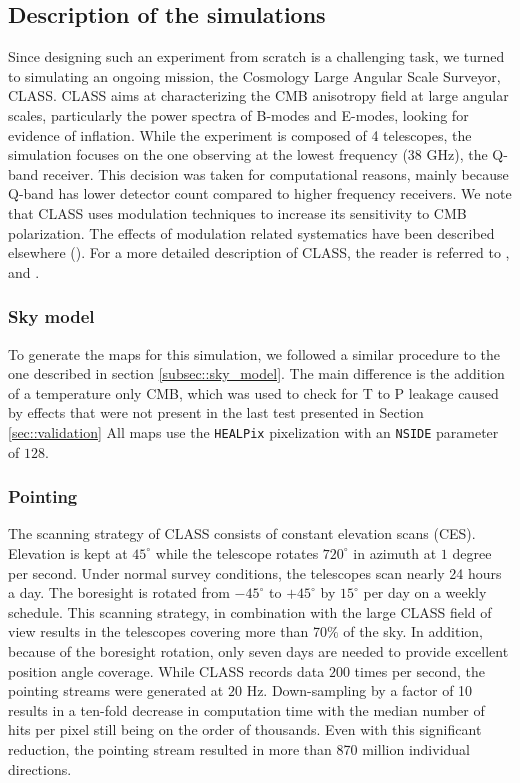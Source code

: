 \documentclass[a4paper,11pt]{article}
\begin{document}
\subsection{Description of the simulations}

Since designing such an experiment from scratch is a challenging task, we turned to simulating an ongoing mission, the Cosmology Large Angular Scale Surveyor, CLASS. CLASS aims at characterizing the CMB anisotropy field at large angular scales, particularly the power spectra of B-modes and E-modes, looking for evidence of inflation. While the experiment is composed of 4 telescopes, the simulation focuses on the one observing at the lowest frequency (38 GHz), the Q-band receiver. This decision was taken for computational reasons, mainly because Q-band has lower detector count compared to higher frequency receivers. We note that CLASS uses modulation techniques to increase its sensitivity to CMB polarization. The effects of modulation related systematics have been described elsewhere (\cite{2016ApJ...818..151M}). For a more detailed description of CLASS, the reader is referred to \cite{2016SPIE.9914E..1KH}, \cite{2014SPIE.9153E..1IE} and \cite{2019ApJ...876..126A}.

\subsubsection{Sky model}

To generate the maps for this simulation, we followed a similar procedure to the one described in section \ref{subsec::sky_model}. The main difference is the addition of a temperature only CMB, which was used to check for T to P leakage caused by effects that were not present in the last test presented in Section \ref{sec::validation} All maps use the \texttt{HEALPix} pixelization with an \texttt{NSIDE} parameter of $128$. 

\subsubsection{Pointing}

The scanning strategy of CLASS consists of constant elevation scans (CES). Elevation is kept at $45^{\circ}$ while the telescope rotates $720^\circ$ in azimuth at $1$ degree per second. Under normal survey conditions, the telescopes scan nearly 24 hours a day. The boresight is rotated from $-45^{\circ}$ to $+45^{\circ}$ by $15^{\circ}$ per day on a weekly schedule. This scanning strategy, in combination with the large CLASS field of view results in the telescopes covering more than 70$\%$ of the sky. In addition, because of the boresight rotation, only seven days are needed to provide excellent position angle coverage. While CLASS records data $200$ times per second, the pointing streams were generated at $20$ Hz. Down-sampling by a factor of 10 results in a ten-fold decrease in computation time with the median number of hits per pixel still being on the order of thousands. Even with this significant reduction, the pointing stream resulted in more than 870 million individual directions. 
\end{document}
